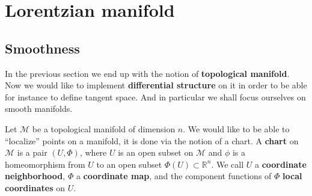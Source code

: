 \documentclass[10pt]{book}
\newcommand{\Mcal}{\mathcal{M}}
\newcommand{\Rbb}{\mathbb{R}}
\theoremstyle{break}
\begin{document}
\section{Lorentzian manifold}


\subsection{Smoothness}


In the previous section we end up with the notion of \textbf{topological manifold}. Now we would like to implement \textbf{differential structure} on it in order to be able for instance to define tangent space. And in particular we shall focus ourselves on smooth manifolds.

\bigskip

Let $\Mcal$ be a topological manifold of dimension $n$. We would like to be able to ``localize'' points on a manifold, it is done via the notion of a chart. A \textbf{chart} on $\Mcal$ is a pair $(U,\Phi)$, where $U$ is an open subset on $\Mcal$ and $\phi$ is a homeomorphism from $U$ to an open subset $\Phi(U) \subset \Rbb^n$. We call $U$ a \textbf{coordinate neighborhood}, $\Phi$ a \textbf{coordinate map}, and the component functions of $\Phi$ \textbf{local coordinates} on $U$.
\end{document}
